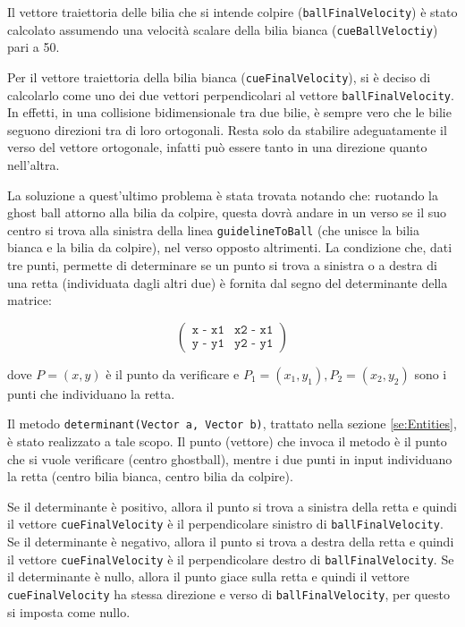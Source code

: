 \documentclass[12pt,a4paper]{report}
\begin{document}
Il vettore traiettoria delle bilia che si intende colpire (\texttt{ballFinalVelocity}) è stato calcolato assumendo una velocità scalare della bilia bianca (\texttt{cueBallVeloctiy}) pari a 50.

Per il vettore traiettoria della bilia bianca (\texttt{cueFinalVelocity}), si è deciso di calcolarlo come uno dei due vettori perpendicolari al vettore \texttt{ballFinalVelocity}. In effetti, in una collisione bidimensionale tra due bilie, è sempre vero che le bilie seguono direzioni tra di loro ortogonali. Resta solo da stabilire adeguatamente il verso del vettore ortogonale, infatti può essere tanto in una direzione quanto nell'altra.

\vspace{3mm}

La soluzione a quest'ultimo problema è stata trovata notando che: ruotando la ghost ball attorno alla bilia da colpire, questa dovrà andare in un verso se il suo centro si trova alla sinistra della linea \texttt{guidelineToBall} (che unisce la bilia bianca e la bilia da colpire), nel verso opposto altrimenti.
La condizione che, dati tre punti, permette di determinare se un punto si trova a sinistra o a destra di una retta (individuata dagli altri due) è fornita dal segno del determinante della matrice:

\[
\begin{pmatrix}
\texttt{x - x1} & \texttt{x2 - x1}\\
\texttt{y - y1} & \texttt{y2 - y1}
\end{pmatrix}
\]

dove $P = (x, y)$ è il punto da verificare e $P_1 = (x_1, y_1), P_2 = (x_2, y_2)$ sono i punti che individuano la retta. \cite{PointSideLineMath}\cite{PointSideLineCode}

\vspace{3mm}

Il metodo \texttt{determinant(Vector a, Vector b)}, trattato nella sezione \ref{se:Entities}, è stato realizzato a tale scopo.
Il punto (vettore) che invoca il metodo è il punto che si vuole verificare (centro ghostball), mentre i due punti in input individuano la retta (centro bilia bianca, centro bilia da colpire).

\vspace{3mm}

Se il determinante è positivo, allora il punto si trova a sinistra della retta e quindi il vettore \texttt{cueFinalVelocity} è il perpendicolare sinistro di \texttt{ballFinalVelocity}.
Se il determinante è negativo, allora il punto si trova a destra della retta e quindi il vettore \texttt{cueFinalVelocity} è il perpendicolare destro di \texttt{ballFinalVelocity}.
Se il determinante è nullo, allora il punto giace sulla retta e quindi il vettore \texttt{cueFinalVelocity} ha stessa direzione e verso di \texttt{ballFinalVelocity}, per questo si imposta come nullo.
\end{document}
